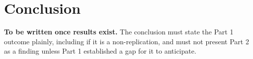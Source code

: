 \section{Conclusion}

\textbf{To be written once results exist.} The conclusion must state the Part 1 outcome
plainly, including if it is a non-replication, and must not present Part 2 as a finding
unless Part 1 established a gap for it to anticipate.
